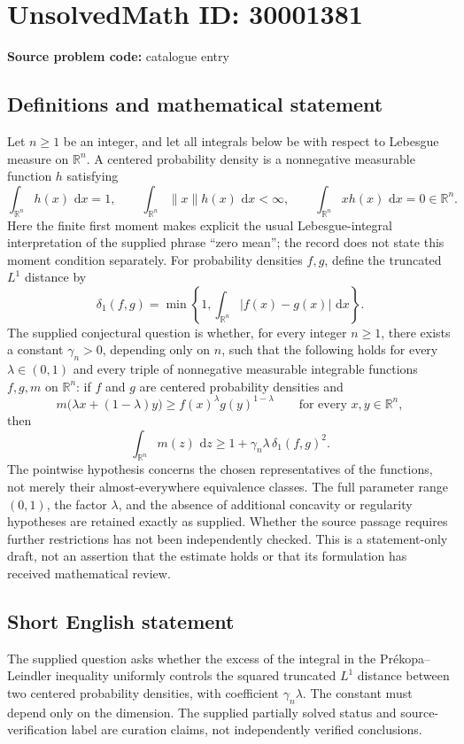 \documentclass[11pt]{article}
\newcommand{\R}{\mathbb{R}}
\newcommand{\dd}{\,\mathrm{d}}
\begin{document}
\section*{UnsolvedMath ID: 30001381}
\textbf{Source problem code:} catalogue entry
\subsection{Definitions and mathematical statement}
Let \(n\geq 1\) be an integer, and let all integrals below be with respect to Lebesgue measure on \(\R^n\). A centered probability density is a nonnegative measurable function \(h\) satisfying
\[
\int_{\R^n}h(x)\,\dd x=1,
\qquad \int_{\R^n}\|x\|h(x)\,\dd x<\infty,
\qquad \int_{\R^n}x h(x)\,\dd x=0\in\R^n.
\]
Here the finite first moment makes explicit the usual Lebesgue-integral interpretation of the supplied phrase ``zero mean''; the record does not state this moment condition separately. For probability densities \(f,g\), define the truncated \(L^1\) distance by
\[
\delta_1(f,g)=\min\left\{1,\int_{\R^n}|f(x)-g(x)|\,\dd x\right\}.
\]
The supplied conjectural question is whether, for every integer \(n\geq1\), there exists a constant \(\gamma_n>0\), depending only on \(n\), such that the following holds for every \(\lambda\in(0,1)\) and every triple of nonnegative measurable integrable functions \(f,g,m\) on \(\R^n\): if \(f\) and \(g\) are centered probability densities and
\[
m\bigl(\lambda x+(1-\lambda)y\bigr)\geq f(x)^\lambda g(y)^{1-\lambda}
\qquad\text{for every }x,y\in\R^n,
\]
then
\[
\int_{\R^n}m(z)\,\dd z\geq 1+\gamma_n\lambda\,\delta_1(f,g)^2.
\]
The pointwise hypothesis concerns the chosen representatives of the functions, not merely their almost-everywhere equivalence classes. The full parameter range \((0,1)\), the factor \(\lambda\), and the absence of additional concavity or regularity hypotheses are retained exactly as supplied. Whether the source passage requires further restrictions has not been independently checked. This is a statement-only draft, not an assertion that the estimate holds or that its formulation has received mathematical review.
\subsection{Short English statement}
The supplied question asks whether the excess of the integral in the Pr\'ekopa--Leindler inequality uniformly controls the squared truncated \(L^1\) distance between two centered probability densities, with coefficient \(\gamma_n\lambda\). The constant must depend only on the dimension. The supplied partially solved status and source-verification label are curation claims, not independently verified conclusions.
\end{document}
